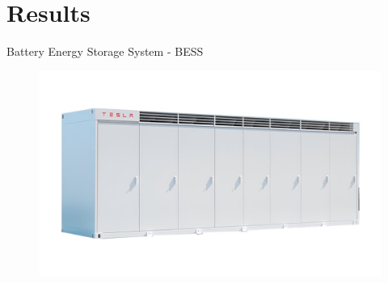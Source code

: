 \documentclass[aspectratio=169]{beamer}
\begin{document}
\section{Results}

\begin{frame}{Battery Energy Storage System - BESS}
    \begin{figure}[h]
        \begin{center}
            \includegraphics[width=0.62\linewidth]{figures/megapack.jpeg}
        \end{center}
    \end{figure}
\end{frame}
\end{document}
